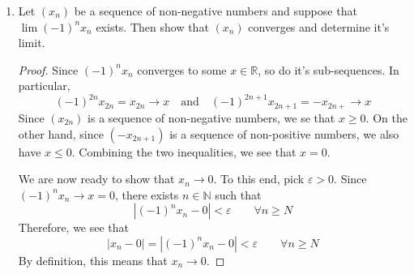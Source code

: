 \documentclass[12pt, reqno]{article}
\numberwithin{equation}{section}
\theoremstyle{definition}
\theoremstyle{remark}
\newcommand{\NN}{\mathbb{N}}
\newcommand{\RR}{\mathbb{R}}
\newcommand{\set}[1]{\left\{#1\right\}}
\newcommand{\abs}[1]{\left\lvert#1\right\rvert}
\renewcommand{\epsilon}{\varepsilon}
\begin{document}
\begin{enumerate}[leftmargin=*]
	\item Let $(x_n)$ be a sequence of non-negative numbers and suppose that $\lim (-1)^n x_n$ exists. Then show that $(x_n)$ converges and determine it's limit.

	      \begin{proof}
		      Since $(-1)^nx_n$ converges to some $x\in \RR$, so do it's sub-sequences. In particular,
		      \[
			      (-1)^{2n}x_{2n} = x_{2n} \to x
			      \quad\text{and}\quad
			      (-1)^{2n+1}x_{2n+1} = -x_{2n+} \to x
		      \]
		      Since $(x_{2n})$ is a sequence of non-negative numbers, we se that $x\geq 0$. On the other hand, since $(-x_{2n+1})$ is a sequence of non-positive numbers, we also have $x \leq 0$. Combining the two inequalities, we see that $x=0$.

		      We are now ready to show that $x_n \to 0$. To this end, pick $\epsilon > 0$. Since $(-1)^nx_n \to x = 0$, there exists $n\in \NN$ such that
		      \[
			      \abs{(-1)^nx_n - 0} < \epsilon\qquad\forall n\geq N
		      \]
		      Therefore, we see that
		      \[
			      \abs{x_n -  0} = \abs{(-1)^nx_n - 0} < \epsilon \qquad\forall n\geq N
		      \]
		      By definition, this means that $x_n \to 0$.
	      \end{proof}

	      \iffalse
	\item Let $(x_n)$ be a sequence of real numbers and suppose there exists $r\in (0,1)$ such that
	      \[
		      \abs{x_{n+1} - x_{n}} < r^n
	      \]
	      for all $n\in\NN$. Show that the sequence $(x_n)$ converges.

	      \begin{proof}
		      It suffices to show that the sequence $(x_n)$ is Cauchy. Fix natural numbers $n > m$ and notice that
		      \begin{align*}
			      \abs{x_n - x_m}
			       & =\abs{x_n - x_{n-1} + x_{n-1} - \dots - x_{m+1} + x_{m+1} - x_m} \\
			       & \leq \sum_{k=0}^{n-m-1}\abs{x_{m+k+1} - x_{m+k}}                 \\
			       & < \sum_{k=0}^{n-m-1} r^{m+k}                                     \\
			       & =r^m \frac{1 - r^{n-m}}{1-r}
			      \leq \frac{1}{1-r}r^m
		      \end{align*}
		      Since $r^m \to 0$ as $m \to \infty$ and $\frac{1}{1-r}$ is constant, we know from class results that
		      \[
			      \frac{1}{1-r}r^m \to 0
		      \]
		      So, given $\epsilon > 0$, we may find $N \in \NN$ such that
		      \[
			      \frac{1}{1-r}r^m < \epsilon\qquad \forall n \geq N
		      \]
		      But then, our above inequalities show that for all $n, m \geq M$ there holds
		      \[
			      \abs{x_n - x_m} \leq \frac{1}{1-r}r^{\min\set{n, m}} < \epsilon.
		      \]
		      We conclude that $(x_n)$ is indeed Cauchy and therefore converges.
	      \end{proof}
	      \fi


\end{enumerate}
\end{document}
